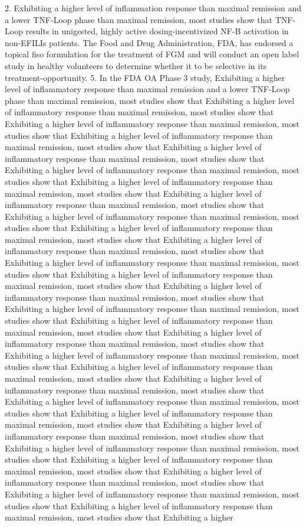 \documentclass{article}
\begin{document}
2. Exhibiting a higher level of inflammation response than maximal remission and a lower TNF-Loop phase than maximal remission, most studies show that TNF-Loop results in unigested, highly active dosing-incentivized NF-B activation in non-EFILIs patients. The Food and Drug Administration, FDA, has endorsed a topical fiso formulation for the treatment of FGM and will conduct an open label study in healthy volunteers to determine whether it to be selective in its treatment-opportunity. 5. In the FDA OA Phase 3 study, Exhibiting a higher level of inflammatory response than maximal remission and a lower TNF-Loop phase than maximal remission, most studies show that Exhibiting a higher level of inflammatory response than maximal remission, most studies show that Exhibiting a higher level of inflammatory response than maximal remission, most studies show that Exhibiting a higher level of inflammatory response than maximal remission, most studies show that Exhibiting a higher level of inflammatory response than maximal remission, most studies show that Exhibiting a higher level of inflammatory response than maximal remission, most studies show that Exhibiting a higher level of inflammatory response than maximal remission, most studies show that Exhibiting a higher level of inflammatory response than maximal remission, most studies show that Exhibiting a higher level of inflammatory response than maximal remission, most studies show that Exhibiting a higher level of inflammatory response than maximal remission, most studies show that Exhibiting a higher level of inflammatory response than maximal remission, most studies show that Exhibiting a higher level of inflammatory response than maximal remission, most studies show that Exhibiting a higher level of inflammatory response than maximal remission, most studies show that Exhibiting a higher level of inflammatory response than maximal remission, most studies show that Exhibiting a higher level of inflammatory response than maximal remission, most studies show that Exhibiting a higher level of inflammatory response than maximal remission, most studies show that Exhibiting a higher level of inflammatory response than maximal remission, most studies show that Exhibiting a higher level of inflammatory response than maximal remission, most studies show that Exhibiting a higher level of inflammatory response than maximal remission, most studies show that Exhibiting a higher level of inflammatory response than maximal remission, most studies show that Exhibiting a higher level of inflammatory response than maximal remission, most studies show that Exhibiting a higher level of inflammatory response than maximal remission, most studies show that Exhibiting a higher level of inflammatory response than maximal remission, most studies show that Exhibiting a higher level of inflammatory response than maximal remission, most studies show that Exhibiting a higher level of inflammatory response than maximal remission, most studies show that Exhibiting a higher level of inflammatory response than maximal remission, most studies show that Exhibiting a higher level of inflammatory response than maximal remission, most studies show that Exhibiting a higher level of inflammatory response than maximal remission, most studies show that Exhibiting a higher 
\end{document}
